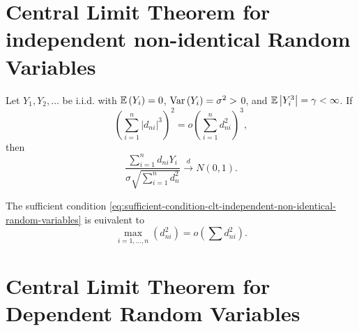 \section{Central Limit Theorem for independent non-identical Random Variables}

\begin{theorem}

\end{theorem}

\begin{theorem}
	Let $Y_1,Y_2,\ldots$ be i.i.d. with ${\mathbb E}\left(Y_{i}\right)=0$, $\mathrm{Var}\left(Y_{i}\right)=\sigma^2>$ 0, and ${\mathbb E}\left|Y_{i}^3\right|=\gamma<\infty$. If
	\begin{equation}
		\label{eq:sufficient-condition-clt-independent-non-identical-random-variables}
		\left(\sum_{i=1}^n\left|d_{ni}\right|^3\right)^2=o\left(\sum_{i=1}^{n}d_{ni}^2\right)^3,
	\end{equation}
	then
	\begin{equation*}
		\frac{\sum_{i=1}^{n}d_{ni}Y_{i}}{\sigma\sqrt{\sum_{i=1}^{n}d_{n }^2}}\stackrel{d}{\rightarrow}N(0,1).
	\end{equation*}
\end{theorem}

\begin{corollary}
	The sufficient condition \eqref{eq:sufficient-condition-clt-independent-non-identical-random-variables} is euivalent to
	\begin{equation}
		\max_{i=1,\ldots,n}\left(d_{ni}^2\right)=o\left(\sum d_{ni}^2\right).
	\end{equation}
\end{corollary}

\section{Central Limit Theorem for Dependent Random Variables}
